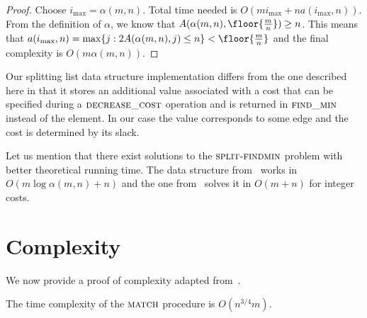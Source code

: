 \begin{proof}
    Choose $i_{\max} = \alpha(m,n)$. Total time needed is $O(mi_{\max} + na(i_{\max},n))$. From the definition of $\alpha$, we know that $A(\alpha(m,n), \floor{\frac{m}{n}}) \geq n$. This means that $a(i_{\max},n) = \max \{ j: 2A(\alpha(m,n), j) \leq n \} < \floor{\frac{m}{n}}$ and the final complexity is $O(m\alpha(m,n))$.
\end{proof}

Our splitting list data structure implementation differs from the one described here in that it stores an additional value associated with a cost that can be specified during a $\textsc{decrease\_cost}$ operation and is returned in $\textsc{find\_min}$ instead of the element. In our case the value corresponds to some edge and the cost is determined by its slack.


Let us mention that there exist solutions to the $\textsc{split-findmin}$ problem with better theoretical running time. The data structure from~\cite{pettie2005sensitivity} works in $O(m \log \alpha(m, n) + n)$ and the one from~\cite{thorup2007equivalence} solves it in $O(m + n)$ for integer costs.

\section{Complexity}

We now provide a proof of complexity adapted from~\cite{gabow1984scaling}.

\begin{theorem}
    The time complexity of the $\textsc{match}$ procedure is $O(n^{3/4}m)$.
\end{theorem}

